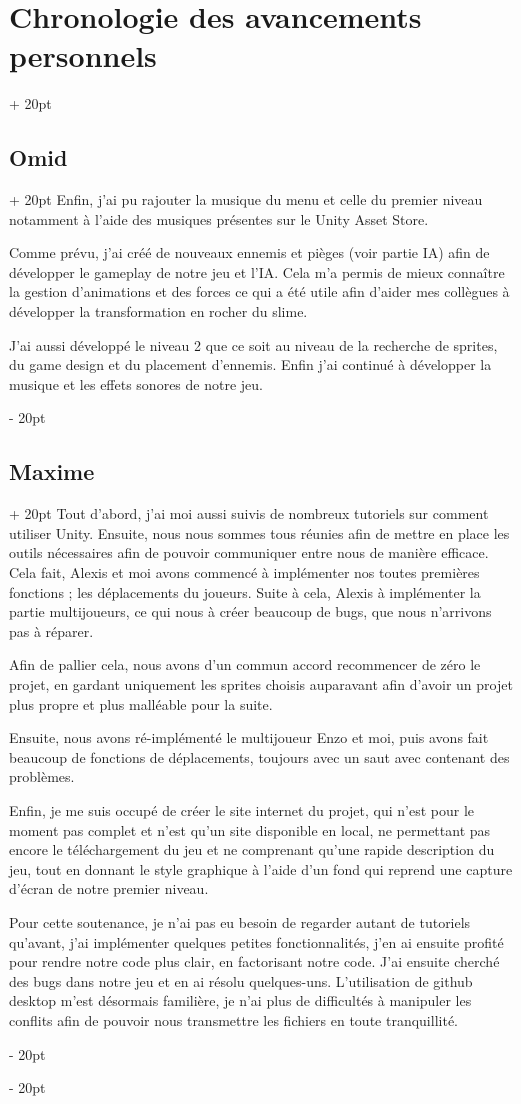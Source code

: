 \documentclass[a4paper, 12pt, twoside]{article}
\newcommand{\ind}[1][20pt]{\advance\leftskip + #1}
\newcommand{\deind}[1][20pt]{\advance\leftskip - #1}
\newenvironment{indt}[2][20pt]{#2 \par \ind[#1]}{\par \deind} %
\begin{document}
\begin{indt}{\section{Chronologie des avancements personnels}}
\begin{indt}{\subsection{Omid}}
            Enfin, j'ai pu rajouter la musique du menu et celle du premier niveau notamment à l'aide des musiques présentes sur le Unity Asset Store.
        
            Comme prévu, j'ai créé de nouveaux ennemis et pièges (voir partie IA) afin de développer le gameplay de notre jeu et l'IA. Cela m'a permis de mieux connaître la gestion d'animations et des forces ce qui a été utile afin d'aider mes collègues à développer la transformation en rocher du slime.

            J'ai aussi développé le niveau 2 que ce soit au niveau de la recherche de sprites, du game design et du placement d'ennemis. Enfin j'ai continué à développer la musique et les effets sonores de notre jeu.

        \end{indt}

        \begin{indt}{\subsection{Maxime}}
            Tout d'abord, j'ai moi aussi suivis de nombreux tutoriels sur comment utiliser Unity. Ensuite, nous nous sommes tous réunies afin de mettre en place les outils nécessaires afin de pouvoir communiquer entre nous de manière efficace. Cela fait, Alexis et moi avons commencé à implémenter nos  toutes premières fonctions ; les déplacements du joueurs. Suite à cela, Alexis à implémenter la partie multijoueurs, ce qui nous à créer beaucoup de bugs, que nous n'arrivons pas à réparer.

            Afin de pallier cela, nous avons d'un commun accord recommencer de zéro le projet, en gardant uniquement les sprites choisis auparavant afin d'avoir un projet plus propre et plus malléable pour la suite. 
            
            Ensuite, nous avons ré-implémenté le multijoueur Enzo et moi, puis avons fait beaucoup de fonctions de déplacements, toujours avec un saut avec contenant des problèmes. 

            Enfin, je me suis occupé de créer le site internet du projet, qui n'est pour le moment pas complet et n'est qu'un site disponible en local, ne permettant pas encore le téléchargement du jeu et ne comprenant qu'une rapide description du jeu, tout en donnant le style graphique à l'aide d'un fond qui reprend une capture d'écran de notre premier niveau.
        
            Pour cette soutenance, je n'ai pas eu besoin de regarder autant de tutoriels qu'avant, j'ai implémenter quelques petites fonctionnalités, j'en ai ensuite profité pour rendre notre code plus clair, en factorisant notre code. J'ai ensuite cherché des bugs dans notre jeu et en ai résolu quelques-uns. L'utilisation de github desktop m'est désormais familière, je n'ai plus de difficultés à manipuler les conflits afin de pouvoir nous transmettre les fichiers en toute tranquillité.
        \end{indt}
    \end{indt}
    
\end{document}
